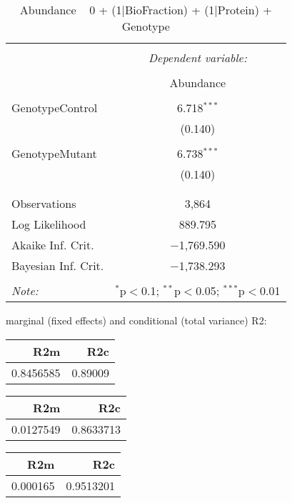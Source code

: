 \documentclass[11pt]{report}
\begin{document}
\begin{table}[!htbp] \centering 
  \caption{Abundance ~ 0 + (1|BioFraction) + (1|Protein) + Genotype} 
  \label{} 
\begin{tabular}{@{\extracolsep{5pt}}lc} 
\\[-1.8ex]\hline 
\hline \\[-1.8ex] 
 & \multicolumn{1}{c}{\textit{Dependent variable:}} \\ 
\cline{2-2} 
\\[-1.8ex] & Abundance \\ 
\hline \\[-1.8ex] 
 GenotypeControl & 6.718$^{***}$ \\ 
  & (0.140) \\ 
  & \\ 
 GenotypeMutant & 6.738$^{***}$ \\ 
  & (0.140) \\ 
  & \\ 
\hline \\[-1.8ex] 
Observations & 3,864 \\ 
Log Likelihood & 889.795 \\ 
Akaike Inf. Crit. & $-$1,769.590 \\ 
Bayesian Inf. Crit. & $-$1,738.293 \\ 
\hline 
\hline \\[-1.8ex] 
\textit{Note:}  & \multicolumn{1}{r}{$^{*}$p$<$0.1; $^{**}$p$<$0.05; $^{***}$p$<$0.01} \\ 
\end{tabular} 
\end{table} 
marginal (fixed effects) and conditional (total variance) R2:

\begin{tabular}{r|r}
\hline
R2m & R2c\\
\hline
0.8456585 & 0.89009\\
\hline
\end{tabular}

\begin{tabular}{r|r}
\hline
R2m & R2c\\
\hline
0.0127549 & 0.8633713\\
\hline
\end{tabular}

\begin{tabular}{r|r}
\hline
R2m & R2c\\
\hline
0.000165 & 0.9513201\\
\hline
\end{tabular}
\end{document}
